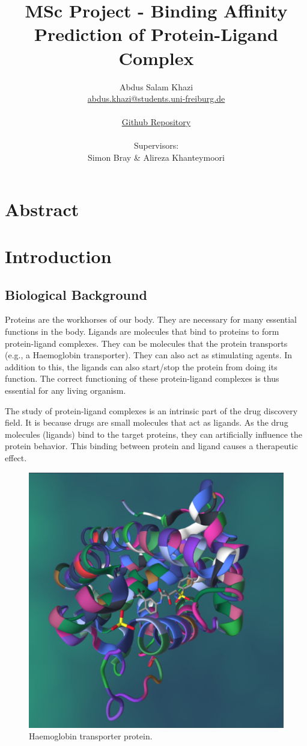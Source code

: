 \documentclass[11pt]{article}
\title{MSc Project - Binding Affinity Prediction of Protein-Ligand Complex}
\author{
        Abdus Salam Khazi\\
        \href{mailto:abdus.khazi@students.uni-freiburg.de}
                {abdus.khazi@students.uni-freiburg.de}\\ \\
        \href{https://github.com/abduskhazi/MSc-Project}
                {Github Repository} \cite{github_repository} \\ \\
        Supervisors:
        \begin{tabular}{ll}
			Simon Bray \&
			Alireza Khanteymoori
		\end{tabular}
       }
\begin{document}
\maketitle
\date{}
\tableofcontents
\newpage

\section{Abstract}
\newpage

\section{Introduction}

\subsection{Biological Background}
Proteins are the workhorses of our body.  They are necessary for many essential functions in the body.  Ligands are molecules that bind to proteins to form protein-ligand complexes.  They can be molecules that the protein transports (e.g., a Haemoglobin transporter). They can also act as stimulating agents.  In addition to this, the ligands can also start/stop the protein from doing its function. The correct functioning of these protein-ligand complexes is thus essential for any living organism.

The study of protein-ligand complexes is an intrinsic part of the drug discovery field. It is because drugs are small molecules that act as ligands. As the drug molecules (ligands) bind to the target proteins, they can artificially influence the protein behavior. This binding between protein and ligand causes a therapeutic effect.

\begin{figure}[htb]
  \centering
    \includegraphics[scale=0.15]{images/pl_complex}
    \caption{Haemoglobin transporter protein.  \cite{PL_complex_introduction}}
    \label{fig:HaemoglobinTransporterImage}
\end{figure}
\end{document}
